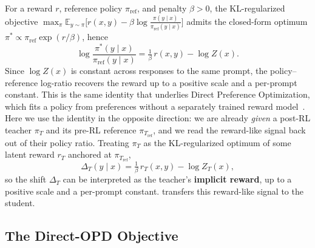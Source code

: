 For a reward $r$, reference policy $\pi_{\mathrm{ref}}$, and penalty $\beta>0$,
the KL-regularized objective
$\max_\pi\mathbb{E}_{y\sim\pi}\!\big[r(x,y)-\beta\log\tfrac{\pi(y\mid x)}{\pi_{\mathrm{ref}}(y\mid x)}\big]$
admits the closed-form optimum $\pi^*\propto\pi_{\mathrm{ref}}\exp(r/\beta)$, hence
\begin{equation}
\log\frac{\pi^*(y\mid x)}{\pi_{\mathrm{ref}}(y\mid x)}
=\tfrac{1}{\beta}\,r(x,y)-\log Z(x).
\end{equation}
Since $\log Z(x)$ is constant across responses to the same prompt, the
policy--reference log-ratio recovers the reward up to a positive scale and a
per-prompt constant. This is the same identity that underlies Direct Preference
Optimization, which fits a policy from preferences without a separately trained
reward model~\citep{rafailov2023direct}. Here we use the identity in the
opposite direction: we are already \textit{given} a post-RL teacher $\pi_T$ and
its pre-RL reference $\pi_{T_{\mathrm{ref}}}$, and we read the reward-like signal
back out of their policy ratio. Treating $\pi_T$ as the KL-regularized optimum of some latent reward $r_T$ anchored at $\pi_{T_{\mathrm{ref}}}$,
\begin{equation}
    \Delta_T(y\mid x) = \tfrac{1}{\beta}\, r_T(x,y) - \log Z_T(x),
    \label{eq:dopd-implicit-reward}
\end{equation}
so the shift $\Delta_T$ can be interpreted as the teacher's \textbf{implicit
reward}, up to a positive scale and a per-prompt constant. \method{} transfers
this reward-like signal to the student.

\subsection{The Direct-OPD Objective}
\label{sec:dopd}

